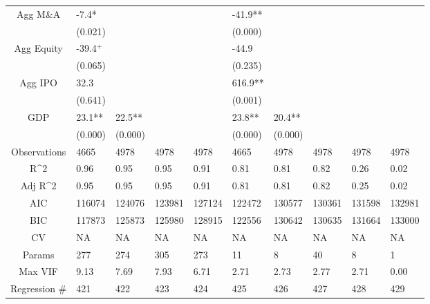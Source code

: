 \documentclass{article}
\begin{document}
\begin{table}[H]
\begin{tabular}{|clllllllll|}
  Agg M\&A & -7.4* &  &  &  & -41.9** &  &  &  &  \\ 
   & (0.021) &  &  &  & (0.000) &  &  &  &  \\ 
  Agg Equity & -39.4$^{+}$ &  &  &  & -44.9 &  &  &  &  \\ 
   & (0.065) &  &  &  & (0.235) &  &  &  &  \\ 
  Agg IPO & 32.3 &  &  &  & 616.9** &  &  &  &  \\ 
   & (0.641) &  &  &  & (0.001) &  &  &  &  \\ 
  GDP & 23.1** & 22.5** &  &  & 23.8** & 20.4** &  &  &  \\ 
   & (0.000) & (0.000) &  &  & (0.000) & (0.000) &  &  &  \\ 
  \hline 
 Observations & 4665 & 4978 & 4978 & 4978 & 4665 & 4978 & 4978 & 4978 & 4978 \\ 
  R^2 & 0.96 & 0.95 & 0.95 & 0.91 & 0.81 & 0.81 & 0.82 & 0.26 & 0.02 \\ 
  Adj R^2 & 0.95 & 0.95 & 0.95 & 0.91 & 0.81 & 0.81 & 0.82 & 0.25 & 0.02 \\ 
  AIC & 116074 & 124076 & 123981 & 127124 & 122472 & 130577 & 130361 & 131598 & 132981 \\ 
  BIC & 117873 & 125873 & 125980 & 128915 & 122556 & 130642 & 130635 & 131664 & 133000 \\ 
  CV & NA & NA & NA & NA & NA & NA & NA & NA & NA \\ 
  Params & 277 & 274 & 305 & 273 & 11 & 8 & 40 & 8 & 1 \\ 
  Max VIF & 9.13 & 7.69 & 7.93 & 6.71 & 2.71 & 2.73 & 2.77 & 2.71 & 0.00 \\ 
  Regression \# & 421 & 422 & 423 & 424 & 425 & 426 & 427 & 428 & 429 \\ 
   \hline
\end{tabular}
 
\end{table}
\end{document}
